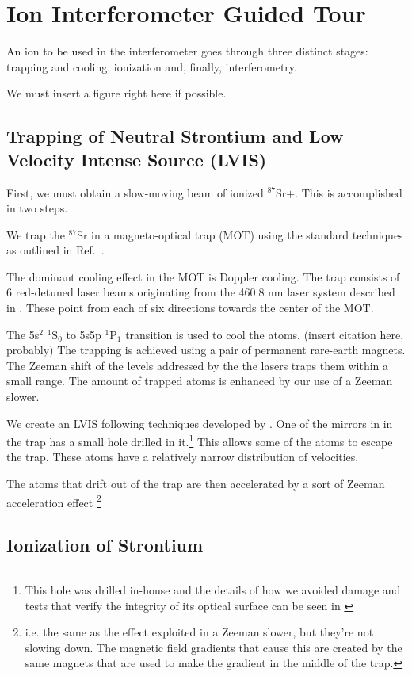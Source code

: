 \chapter{Ion Interferometer Guided Tour}
An ion to be used in the interferometer goes through three distinct stages: trapping and cooling, ionization and, finally, interferometry. 

We must insert a figure right here if possible. 

\section{Trapping of Neutral Strontium and Low Velocity Intense Source (LVIS)}

First, we must obtain a slow-moving beam of ionized $^{87}$Sr$+$. This is accomplished in two steps. 

We trap the $^{87}$Sr in a magneto-optical trap (MOT) using the standard techniques as outlined in Ref.\ \cite{cjeDiss}. 

The dominant cooling effect in the MOT is Doppler cooling. The trap consists of 6 red-detuned laser beams originating from the 460.8 nm laser system described in \cite{cjeDiss}. These point from each of six directions towards the center of the MOT. 

The 5s$^2$ $^1$S$_0$ to 5s5p $^1$P$_1$ transition is used to cool the atoms. (insert citation here, probably) 
The trapping is achieved using a pair of permanent rare-earth magnets. The Zeeman shift of the levels addressed by the the lasers traps them within a small range. The amount of trapped atoms is enhanced by our use of a Zeeman slower. 

We create an LVIS \cite{cjeDiss} following techniques developed by \cite{LVIS}. One of the mirrors in in the trap has a small hole drilled in it.\footnote{This hole was drilled in-house and the details of how we avoided damage and tests that verify the integrity of its optical surface can be seen in \cite{cjeDiss}} This allows some of the atoms to escape the trap. These atoms have a relatively narrow distribution of velocities. 

The atoms that drift out of the trap are then accelerated by a sort of Zeeman acceleration effect \footnote{i.e. the same as the effect exploited in a Zeeman slower, but they're not slowing down. The magnetic field gradients that cause this are created by the same magnets that are used to make the gradient in the middle of the trap.}

\section{Ionization of Strontium}
 
